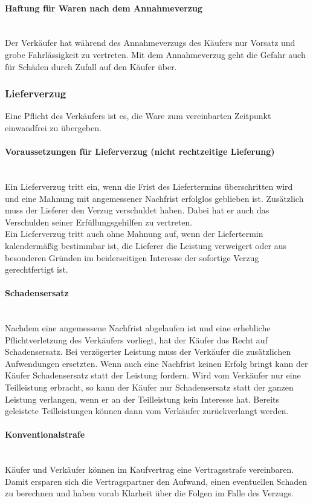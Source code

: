 	\paragraph{Haftung für Waren nach dem Annahmeverzug}~\\Der Verkäufer hat während des Annahmeverzugs des Käufers nur Vorsatz und grobe Fahrlässigkeit zu vertreten. Mit dem Annahmeverzug geht die Gefahr auch für Schäden durch Zufall auf den Käufer über.
	
\subsubsection{Lieferverzug}
Eine Pflicht des Verkäufers ist es, die Ware zum vereinbarten Zeitpunkt einwandfrei zu übergeben.
	 \paragraph{Voraussetzungen für Lieferverzug (nicht rechtzeitige Lieferung)}~\\ Ein Lieferverzug tritt ein, wenn die Frist des Liefertermins überschritten wird und eine Mahnung mit angemessener Nachfrist erfolglos geblieben ist. Zusätzlich muss der Lieferer den Verzug verschuldet haben. Dabei hat er auch das Verschulden seiner Erfüllungsgehilfen zu vertreten. \\
Ein Lieferverzug tritt auch ohne Mahnung auf, wenn der Liefertermin kalendermäßig bestimmbar ist, die Lieferer die Leistung verweigert oder aus besonderen Gründen im beiderseitigen Interesse der sofortige Verzug gerechtfertigt ist.
	\paragraph{Schadensersatz}~\\ Nachdem eine angemessene Nachfrist abgelaufen ist und eine erhebliche Pflichtverletzung des Verkäufers vorliegt, hat der Käufer das Recht auf Schadensersatz. Bei verzögerter Leistung muss der Verkäufer die zusätzlichen Aufwendungen ersetzten. Wenn auch eine Nachfrist keinen Erfolg bringt kann der Käufer Schadensersatz statt der Leistung fordern. Wird vom Verkäufer nur eine Teilleistung erbracht, so kann der Käufer nur Schadensersatz statt der ganzen Leistung verlangen, wenn er an der Teilleistung kein Interesse hat. Bereits geleistete Teilleistungen können dann vom Verkäufer zurückverlangt werden.
	\paragraph{Konventionalstrafe}~\\ Käufer und Verkäufer können im Kaufvertrag eine Vertragsstrafe vereinbaren. Damit ersparen sich die Vertragspartner den Aufwand, einen eventuellen Schaden zu berechnen und haben vorab Klarheit über die Folgen im Falle des Verzugs.
